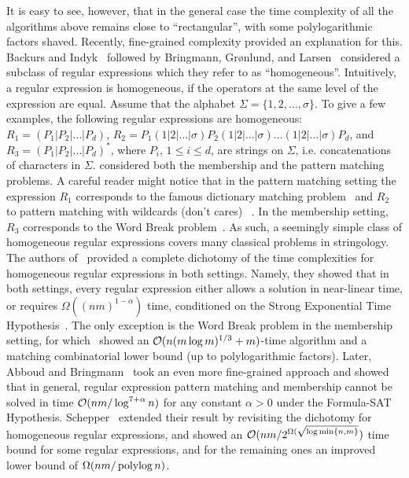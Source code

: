 It is easy to see, however, that in the general case the time complexity of all the algorithms above remains close to ``rectangular'', with some polylogarithmic factors shaved. Recently, fine-grained complexity provided an explanation for this.   
Backurs and Indyk~\cite{DBLP:conf/focs/BackursI16} followed by Bringmann, Gr{\o}nlund, and Larsen~\cite{8104068} considered a subclass of regular expressions which they refer to as ``homogeneous''.  Intuitively, a regular expression is homogeneous, if the operators at the same level of the expression are equal. 
Assume that the alphabet $\Sigma = \{1, 2,\ldots, \sigma\}$. To give a few examples, the following regular expressions are homogeneous: $R_1 = (P_1 | P_2 | \ldots | P_d)$, $R_2 = P_1 (1|2|\ldots|\sigma) P_2 (1|2|\ldots|\sigma) \ldots (1|2|\ldots|\sigma) P_d$, and $R_3 = (P_1 | P_2 | \ldots | P_d)^\ast$, where $P_i$, $1 \le i \le d$, are strings on $\Sigma$, i.e. concatenations of characters in $\Sigma$. \cite{DBLP:conf/focs/BackursI16,8104068} considered both the membership and the pattern matching problems. A careful reader might notice that in the pattern matching setting the expression $R_1$ corresponds to the famous dictionary matching problem~\cite{10.1145/360825.360855} and $R_2$ to pattern matching with wildcards (don't cares) ~\cite{10.5555/889566,10.5555/545381.545468,10.1145/509907.509992,10.5555/795664.796430,CLIFFORD200753}. 
In the membership setting, $R_3$ corresponds to the Word Break problem~\cite{wordbreak1,wordbreak2}. As such, a seemingly simple class of homogeneous regular expressions covers many classical problems in stringology. The authors of~\cite{DBLP:conf/focs/BackursI16,8104068} provided a complete dichotomy of the time complexities for homogeneous regular expressions in both settings. Namely, they showed that in both settings, every regular expression either allows a solution in near-linear time, or requires $\Omega((nm)^{1-\alpha})$ time, conditioned on the Strong Exponential Time Hypothesis~\cite{IMPAGLIAZZO2001367}. The only exception is the Word Break problem in the membership setting, for which~\cite{8104068} showed an $\mathcal{O}(n (m \log m)^{1/3}+m)$-time algorithm and a matching combinatorial lower bound (up to polylogarithmic factors).
Later, Abboud and Bringmann~\cite{DBLP:conf/icalp/AbboudB18} took an even more fine-grained approach and
showed that in general, regular expression pattern matching and membership cannot be solved in time $\mathcal{O}(nm/ \log^{7+\alpha} n)$ for any constant $\alpha > 0$ under the Formula-SAT Hypothesis. Schepper~\cite{schepper:LIPIcs:2020:12946} extended their result
by revisiting the dichotomy for homogeneous regular expressions,
and showed an $\mathcal{O}(nm/2^{\Omega(\sqrt{\log {\min\{n,m\}}}})$ time bound for some regular expressions, and for the remaining ones an improved lower bound of $\Omega(nm/\operatorname{polylog} n)$.  
 
